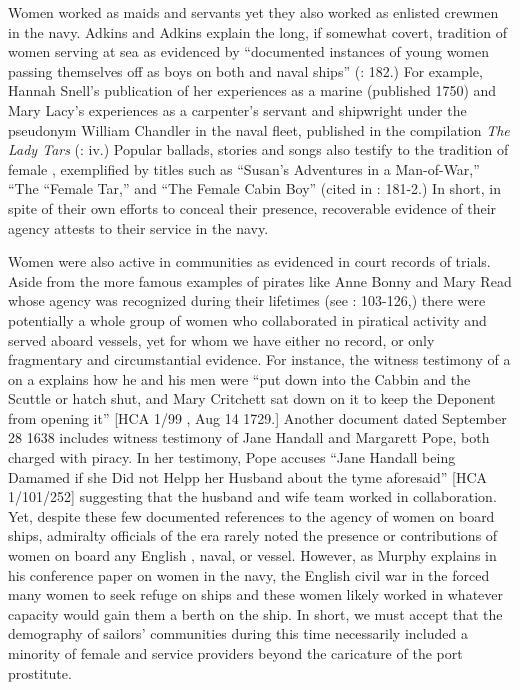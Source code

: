   Women worked as maids and servants yet they also worked as enlisted crewmen in the navy. Adkins and Adkins explain the long, if somewhat covert, tradition of women serving at sea as evidenced by “documented instances of young women passing themselves off as boys on both  and naval ships” (\citeyear*{AdkinsAdkins2008}: 182.) For example, Hannah Snell’s publication of her experiences as a marine (published 1750) and Mary Lacy’s experiences as a carpenter’s servant and shipwright under the pseudonym William Chandler in the naval fleet, published in the compilation \textit{The Lady Tars} (\citealt{SnellEtAl2008}: iv.) Popular ballads, stories and songs also testify to the tradition of female , exemplified by titles such as “Susan’s Adventures in a Man-of-War,” “The “Female Tar,” and “The Female Cabin Boy” (cited in \citealt{AdkinsAdkins2008}: 181-2.) In short, in spite of their own efforts to conceal their presence, recoverable evidence of their agency attests to their service in the navy. 

Women were also active in  communities as evidenced in court records of trials. Aside from the more famous examples of pirates like Anne Bonny and Mary Read whose agency was recognized during their lifetimes (see \citealt{Rediker2004}: 103-126,) there were potentially a whole group of women who collaborated in piratical activity and served aboard  vessels, yet for whom we have either no record, or only fragmentary and circumstantial evidence. For instance, the witness testimony of a  on a  explains how he and his men were “put down into the Cabbin and the Scuttle or hatch shut, and Mary Critchett sat down on it to keep the Deponent from opening it” [HCA 1/99 , Aug 14 1729.] Another document dated September 28 1638 includes witness testimony of Jane Handall and Margarett Pope, both charged with piracy. In her testimony, Pope accuses “Jane Handall being Damamed if she Did not Helpp her Husband about the tyme aforesaid” [HCA 1/101/252] suggesting that the husband and wife team worked in collaboration. Yet, despite these few documented references to the agency of women on board  ships, admiralty officials of the era rarely noted the presence or contributions of women on board any English , naval, or  vessel. However, as Murphy explains in his  conference paper on women in the navy, the English civil war in the  forced many women to seek refuge on ships and these women likely worked in whatever capacity would gain them a berth on the ship. In short, we must accept that the demography of sailors’ communities during this time necessarily included a minority of female  and service providers beyond the caricature of the port prostitute. 

